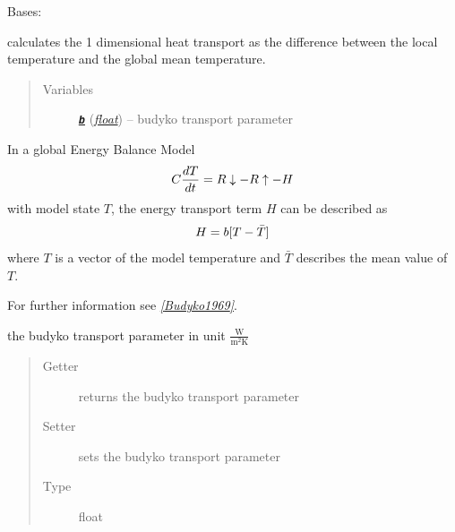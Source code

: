 \documentclass[letterpaper,10pt,english]{sphinxmanual}
\begin{document}
\begin{fulllineitems}
\label{api/climlab.dynamics:climlab.dynamics.budyko_transport.BudykoTransport}
Bases: {\hyperref[api/climlab.process:climlab.process.energy_budget.EnergyBudget]{\emph{}}}

calculates the 1 dimensional heat transport as the difference 
between the local temperature and the global mean temperature.
\begin{quote}\begin{description}
\item[{Variables}] \leavevmode
{\hyperref[api/climlab.dynamics:climlab.dynamics.budyko_transport.BudykoTransport.b]{\emph{\textbf{\texttt{b}}}}} (\href{http://docs.python.org/2.7/library/functions.html\#float}{\emph{float}}) -- budyko transport parameter

\end{description}\end{quote}

In a global Energy Balance Model
\begin{gather}
\begin{split}C \frac{dT}{dt} = R\downarrow - R\uparrow - H\end{split}\notag
\end{gather}
with model state \(T\), the energy transport term \(H\) 
can be described as
\begin{gather}
\begin{split}H = b [T - \bar{T}]\end{split}\notag
\end{gather}
where \(T\) is a vector of the model temperature and \(\bar{T}\)
describes the mean value of \(T\).

For further information see \label{api/climlab.dynamics:id1}{\hyperref[references:budyko1969]{\emph{{[}Budyko1969{]}}}}.

\begin{fulllineitems}
\label{api/climlab.dynamics:climlab.dynamics.budyko_transport.BudykoTransport.b}
the budyko transport parameter in unit 
\(\frac{\textrm{W}}{\textrm{m}^2 \textrm{K}}\)
\begin{quote}\begin{description}
\item[{Getter}] \leavevmode
returns the budyko transport parameter

\item[{Setter}] \leavevmode
sets the budyko transport parameter

\item[{Type}] \leavevmode
float

\end{description}\end{quote}

\end{fulllineitems}


\end{fulllineitems}
\end{document}
